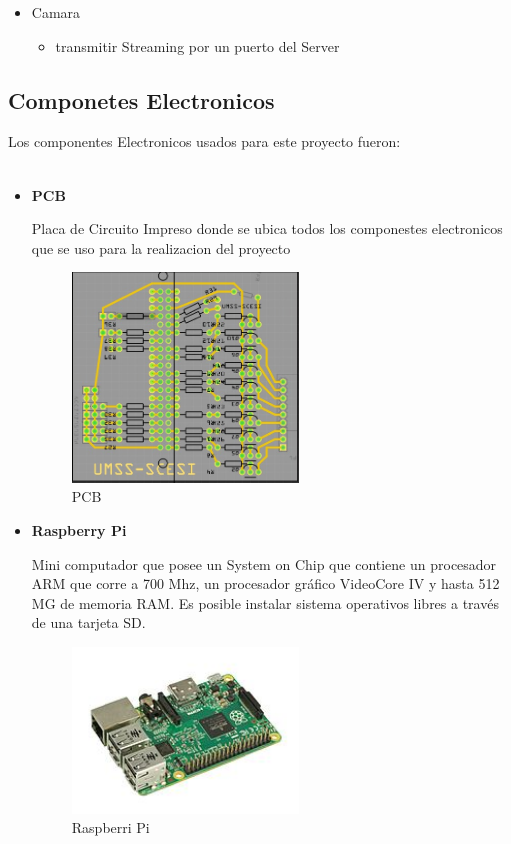 \documentclass[letterpaper,12pt]{article}
\begin{document}
{\begin{itemize}
\begin{itemize}
	\end{itemize}
	\item Camara	
	\begin{itemize}
		\item transmitir Streaming por un puerto del Server
	\end{itemize}

\end{itemize}

\subsection{Componetes Electronicos}
Los componentes Electronicos usados para este proyecto fueron:\\\\
\begin{itemize}
	
	\item \textbf{PCB}
	
	Placa de Circuito Impreso donde  se ubica todos los componestes electronicos que se uso para la realizacion del proyecto
	
	\begin{figure}[h]
		\centering
		\begin{minipage}[t]{5.5cm}
			\includegraphics[width=6cm]{images/PCB.jpeg}	 %
			\caption{ PCB}
		\end{minipage}
		
	\end{figure}
	
	
	\item \textbf{Raspberry Pi}
	
	Mini computador que  posee un System on Chip que contiene un procesador ARM que corre a 700 Mhz, un procesador gráfico VideoCore IV y hasta 512 MG de memoria RAM. Es posible instalar sistema operativos libres a través de una tarjeta SD.
	
	\begin{figure}[h]
		\centering
		\begin{minipage}[t]{5.5cm}
			\includegraphics[width=6cm]{images/RaspberryPI.jpg}	 %
			\caption{ Raspberri Pi}
		\end{minipage}
		

\end{figure}
\end{itemize}}
\end{document}
